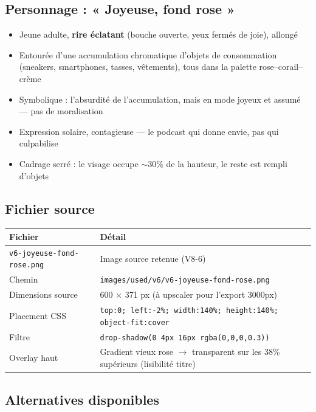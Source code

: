 \documentclass[a4paper,11pt]{article}
\newcommand{\tableheader}{\rowcolor{tableHeader}\bfseries}
\begin{document}
\subsection{Personnage : « Joyeuse, fond rose »}

\begin{itemize}[nosep]
  \item Jeune adulte, \textbf{rire éclatant} (bouche ouverte, yeux fermés de joie), allongé
  \item Entourée d'une accumulation chromatique d'objets de consommation (sneakers, smartphones, tasses, vêtements), tous dans la palette rose–corail–crème
  \item Symbolique : l'absurdité de l'accumulation, mais en mode joyeux et assumé — pas de moralisation
  \item Expression solaire, contagieuse — le podcast qui donne envie, pas qui culpabilise
  \item Cadrage serré : le visage occupe $\sim$30\% de la hauteur, le reste est rempli d'objets
\end{itemize}

\subsection{Fichier source}

\begin{tcolorbox}[card]
\begin{tabularx}{\textwidth}{@{}lX@{}}
\toprule
\tableheader Fichier & Détail \\
\midrule
\texttt{v6-joyeuse-fond-rose.png} & Image source retenue (V8-6) \\
Chemin & \texttt{images/used/v6/v6-joyeuse-fond-rose.png} \\
Dimensions source & 600 × 371 px (à upscaler pour l'export 3000px) \\
Placement CSS & \texttt{top:0; left:-2\%; width:140\%; height:140\%; object-fit:cover} \\
Filtre & \texttt{drop-shadow(0 4px 16px rgba(0,0,0,0.3))} \\
Overlay haut & Gradient vieux rose $\rightarrow$ transparent sur les 38\% supérieurs (lisibilité titre) \\
\bottomrule
\end{tabularx}
\end{tcolorbox}

\subsection{Alternatives disponibles}
\end{document}
